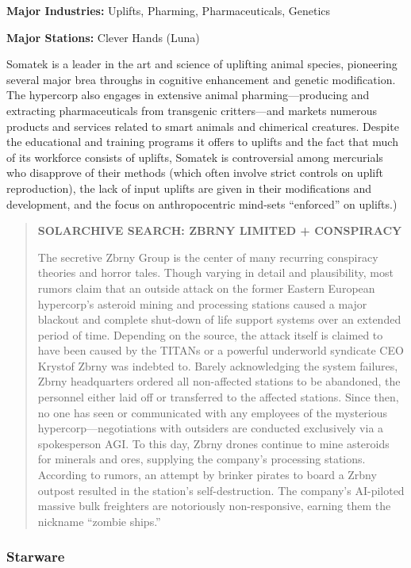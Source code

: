 \textbf{Major Industries:} Uplifts, Pharming, Pharmaceuticals, Genetics

\textbf{Major Stations:} Clever Hands (Luna)


Somatek is a leader in the art and science of uplifting animal
species, pioneering several major brea throughs in cognitive
enhancement and genetic modification. The hypercorp also engages in
extensive animal pharming—producing and extracting pharmaceuticals
from transgenic critters—and markets numerous products and services
related to smart animals and chimerical creatures. Despite the
educational and training programs it offers to uplifts and the fact
that much of its workforce consists of uplifts, Somatek is
controversial among mercurials who disapprove of their methods (which
often involve strict controls on uplift reproduction), the lack of
input uplifts are given in their modifications and development, and
the focus on anthropocentric mind-sets “enforced” on uplifts.)

\begin{quotation}
  \textbf{SOLARCHIVE SEARCH: ZBRNY LIMITED + CONSPIRACY}

  The secretive Zbrny Group is the center of many recurring conspiracy
  theories and horror tales. Though varying in detail and
  plausibility, most rumors claim that an outside attack on the former
  Eastern European hypercorp’s asteroid mining and processing stations
  caused a major blackout and complete shut-down of life support
  systems over an extended period of time. Depending on the source,
  the attack itself is claimed to have been caused by the TITANs or a
  powerful underworld syndicate CEO Krystof Zbrny was indebted
  to. Barely acknowledging the system failures, Zbrny headquarters
  ordered all non-affected stations to be abandoned, the personnel
  either laid off or transferred to the affected stations. Since then,
  no one has seen or communicated with any employees of the mysterious
  hypercorp—negotiations with outsiders are conducted exclusively via
  a spokesperson AGI. To this day, Zbrny drones continue to mine
  asteroids for minerals and ores, supplying the company’s processing
  stations. According to rumors, an attempt by brinker pirates to
  board a Zrbny outpost resulted in the station’s
  self-destruction. The company’s AI-piloted massive bulk freighters
  are notoriously non-responsive, earning them the nickname “zombie
  ships.”
\end{quotation}

\subsubsection{Starware}
\label{sec:starware}

